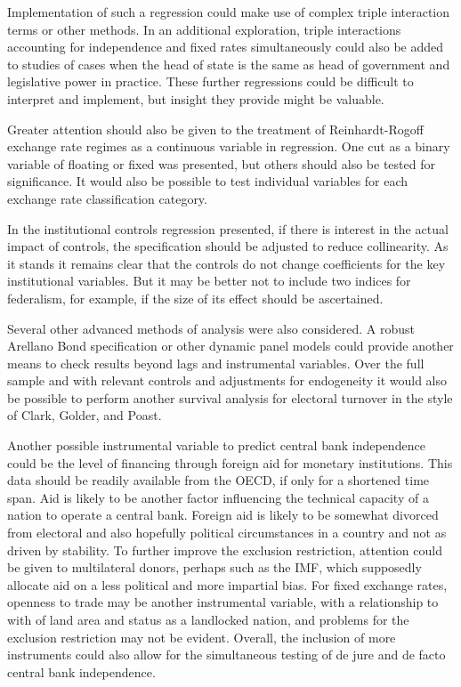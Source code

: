 \documentclass{article}
\begin{document}
    Implementation of such a regression could make use of complex triple interaction terms or other methods. In an additional exploration, triple interactions accounting for independence and fixed rates simultaneously could also be added to studies of cases when the head of state is the same as head of government and legislative power in practice. These further regressions could be difficult to interpret and implement, but insight they provide might be valuable.

    Greater attention should also be given to the treatment of Reinhardt-Rogoff exchange rate regimes as a continuous variable in regression. One cut as a binary variable of floating or fixed was presented, but others should also be tested for significance. It would also be possible to test individual variables for each exchange rate classification category.
    
    In the institutional controls regression presented, if there is interest in the actual impact of controls, the specification should be adjusted to reduce collinearity. As it stands it remains clear that the controls do not change coefficients for the key institutional variables. But it may be better not to include two indices for federalism, for example, if the size of its effect should be ascertained.

    Several other advanced methods of analysis were also considered. A robust Arellano Bond specification or other dynamic panel models could provide another means to check results beyond lags and instrumental variables. Over the full sample and with relevant controls and adjustments for endogeneity it would also be possible to perform another survival analysis for electoral turnover in the style of Clark, Golder, and Poast.

    Another possible instrumental variable to predict central bank independence could be the level of financing through foreign aid for monetary institutions. This data should be readily available from the OECD, if only for a shortened time span. Aid is likely to be another factor influencing the technical capacity of a nation to operate a central bank. Foreign aid is likely to be somewhat divorced from electoral and also hopefully political circumstances in a country and not as driven by stability. To further improve the exclusion restriction, attention could be given to multilateral donors, perhaps such as the IMF, which supposedly allocate aid on a less political and more impartial bias. For fixed exchange rates, openness to trade may be another instrumental variable, with a relationship to with of land area and status as a landlocked nation, and problems for the exclusion restriction may not be evident. Overall, the inclusion of more instruments could also allow for the simultaneous testing of de jure and de facto central bank independence.
\end{document}

